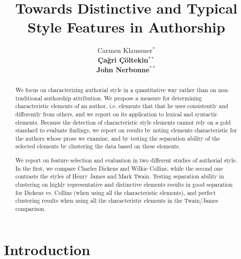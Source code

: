 \documentclass[a4paper,10pt,twoside,fleqn]{article}
\begin{document}
\title{Towards Distinctive and Typical Style Features in Authorship}


\author{Carmen Klaussner$^*$ \\
{\normalsize \bf \c{C}a\u{g}ri \c{C}öltekin}$^{**}$ \\
{\normalsize \bf John Nerbonne}$^{**}$ 
\AND {}
\AND {} }


\maketitle\thispagestyle{empty} %


\begin{abstract}
We focus on characterizing authorial style in a quantitative way rather than
on non-traditional authorship attribution.  We propose a measure for determining
characteristic elements of an author, i.e. elements that that he uses consistently
and differently from others, and we report on its application to
lexical and syntactic elements.  Because the detection of characteristic
style elements cannot rely on a gold standard to
evaluate findings,  we report on results by noting elements characteristic for
the authors whose prose we examine, and by testing the separation ability
of the selected elements by clustering the data based on these elements.

We report on feature selection and evaluation in two different
studies of authorial style. In the first, we compare Charles Dickens
and Wilkie Collins, while the second one contrasts the
styles of Henry James and Mark Twain. Testing separation ability
in clustering on highly representative and distinctive elements
results in good separation for Dickens
vs. Collins (when using all the characteristic elements), and perfect
clustering results when using all the characteristic elements
in the Twain/James comparison.
\end{abstract}


\section{Introduction}
\end{document}
